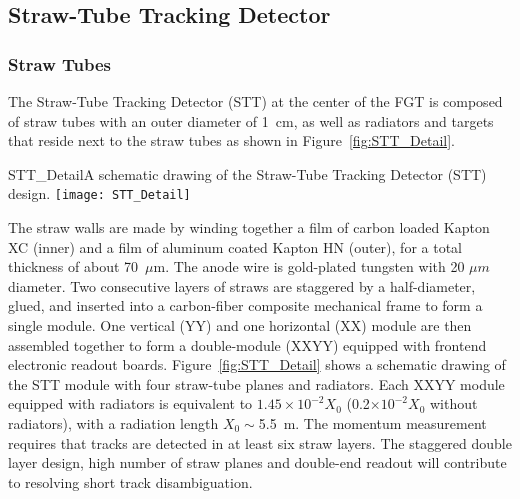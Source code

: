 


\subsection{Straw-Tube Tracking Detector}
\label{cdrsec:detectors-nd-ref-fgt-stt}


\subsubsection{Straw Tubes} 

The Straw-Tube Tracking Detector (STT) at the center of the FGT 
is composed of straw tubes with an outer diameter of 1~cm, as well as 
radiators and targets that reside next to the straw tubes as shown in Figure~\ref{fig:STT_Detail}.
\begin{cdrfigure}
{STT_Detail}{A schematic drawing of the Straw-Tube Tracking Detector (STT) design.}
\texttt{[image: STT\_Detail]}
\end{cdrfigure}

The straw walls are made by winding together a film of carbon loaded
Kapton XC (inner) and a film of aluminum coated Kapton HN (outer), for
a total thickness of about 70~$\mu$m. The anode wire is gold-plated
tungsten with 20 $\mu m$ diameter.  Two consecutive layers of straws
are staggered by a half-diameter, glued, and inserted into a
carbon-fiber composite mechanical frame to form a single module.  One
vertical (YY) and one horizontal (XX) module are then assembled
together to form a double-module (XXYY) equipped with frontend
electronic readout boards.  Figure~\ref{fig:STT_Detail} shows a
schematic drawing of the STT module with four straw-tube planes and
radiators. Each XXYY module equipped with radiators is equivalent to
$1.45 \times 10^{-2} X_0$ (0.2$\times10^{-2} X_0$ without
radiators), with a radiation length $X_0 \sim$5.5~m. The momentum
measurement requires that tracks are detected in at least six straw
layers. The staggered double layer design, high number of straw planes
and double-end readout will contribute to resolving short track
disambiguation.



